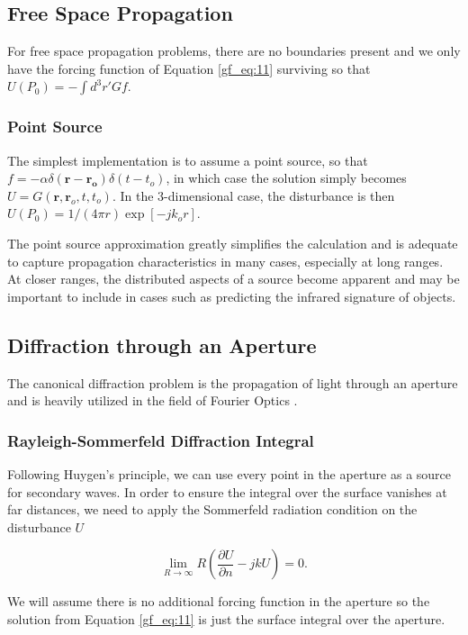 \subsection {Free Space Propagation}
For free space propagation problems, there are no boundaries present and we only have the forcing function of Equation \ref{gf_eq:11} surviving so that $U(P_0) = -\int d^3r' Gf$. 

\subsubsection{Point Source}
The simplest implementation is to assume a point source, so that $f= -\alpha \delta(\mathbf{r}-\mathbf{r_o})\delta(t-t_o)$, in which case the solution simply becomes $U = G(\mathbf{r},\mathbf{r}_o,t,t_o)$. In the 3-dimensional case, the disturbance is then $U(P_0) =1/(4\pi r)\exp[-jk_or]$.

The point source approximation greatly simplifies the calculation and is adequate to capture propagation characteristics in many cases, especially at long ranges. At closer ranges, the distributed aspects of a source become apparent and may be important to include in cases such as predicting the infrared signature of objects.

\subsection {Diffraction through an Aperture}
The canonical diffraction problem is the propagation of light through an aperture and is heavily utilized in the field of Fourier Optics \cite{goodman_fourier} \cite{gaskill_fourier}.

\subsubsection{Rayleigh-Sommerfeld Diffraction Integral}
Following Huygen's principle, we can use every point in the aperture as a source for secondary waves. In order to ensure the integral over the surface vanishes at far distances, we need to apply the Sommerfeld radiation condition on the disturbance $U$

\begin{equation}
 \lim_{R\to\infty} R\left(\frac{\partial U}{\partial n} -jkU \right) = 0.
\label{gf_eq:48}
\end{equation}
\renewcommand{\baselinestretch}{2} \small\normalsize

We will assume there is no additional forcing function in the aperture so the solution from Equation \ref{gf_eq:11} is just the surface integral over the aperture.

